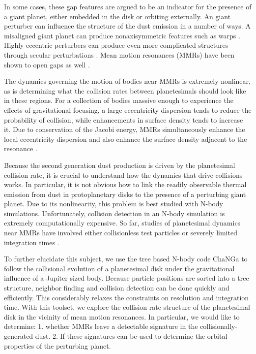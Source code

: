 \documentclass[onecolumn]{aastex63}
\begin{document}
In some cases, these gap features are argued to be an indicator for the presence of a giant planet, either embedded in the disk 
\citep{2015MNRAS.453L..73D} or orbiting externally. An giant perturber can influence the structure of the dust emission in a number 
of ways. A misaligned giant planet can produce nonaxisymmetric features such as warps \citep{2001A&A...370..447A}. Highly 
eccentric perturbers can produce even more complicated structures through secular perturbations \citep{2014MNRAS.443.2541P, 
2015MNRAS.448.3679P}. Mean motion resonances (MMRs) have been shown to open gaps as well
\citep{2015ApJ...798...83N, 2016ApJ...818..159T, 2018ApJ...857....3T}.

The dynamics governing the motion of bodies near MMRs is extremely nonlinear, as is determining what the collision rates between 
planetesimals should look like in these regions. For a collection of bodies massive enough to experience the effects of gravitational 
focusing, a large eccentricity dispersion tends to reduce the probability of collision, while enhancements in surface density tends to 
increase it. Due to conservation of the Jacobi energy, MMRs simultaneously enhance the local eccentricity dispersion and also 
enhance the surface density adjacent to the resonance \citep{2000Icar..143...45R, 2017ApJ...850..103B}.

Because the second generation dust production is driven by the planetesimal collision rate, it is crucial to understand how the 
dynamics that drive collisions works. In particular, it is not obvious how to link the readily observable thermal emission from dust in 
protoplanetary disks to the presence of a perturbing giant planet. Due to its nonlinearity, this problem is best studied with N-body 
simulations. Unfortunately, collision detection in an N-body simulation is extremely computationally expensive. So far, studies of 
planetesimal dynamics near MMRs have involved either collisionless test particles \citep{2017ApJ...850..103B, 2016ApJ...818..159T, 
2018ApJ...857....3T} or severely limited integration times \citep{2000Icar..143...45R}.

To further elucidate this subject, we use the tree based N-body code {\sc ChaNGa}
\citep{2008IEEEpds...ChaNGa, 2015AphCom..2..1} to follow the collisional evolution of a planetesimal disk under the gravitational 
influence of a Jupiter sized body. Because particle positions are sorted into a tree structure, neighbor finding and collision detection 
can be done quickly and efficiently. This considerably relaxes the constraints on resolution and integration time. With this toolset, we 
explore the collision rate structure of the planetesimal disk in the vicinity of mean motion resonances. In particular, we would like to 
determine: 1. whether MMRs leave a detectable signature in the collisionally-generated dust. 2. If these signatures can be used to determine the orbital properties of the perturbing planet.
\end{document}
